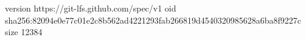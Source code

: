 version https://git-lfs.github.com/spec/v1
oid sha256:82094e0e77c01e2c8b562ad4221293fab266819d4540320985628a6ba8f9227c
size 12384
